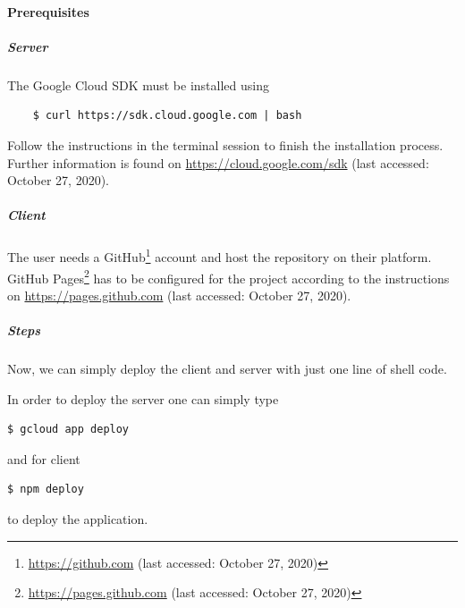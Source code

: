 \paragraph{Prerequisites}   

\subparagraph{Server}
The Google Cloud SDK must be installed using 
\begin{verbatim}
    $ curl https://sdk.cloud.google.com | bash
\end{verbatim}
Follow the instructions in the terminal session to finish the installation process. Further information is found on \url{https://cloud.google.com/sdk} (last accessed: October 27, 2020).

\subparagraph{Client}
The user needs a GitHub\footnote{\url{https://github.com} (last accessed: October 27, 2020)} account and host the repository on their platform. GitHub Pages\footnote{\url{https://pages.github.com} (last accessed: October 27, 2020)} has to be configured for the project according to the instructions on \url{https://pages.github.com} (last accessed: October 27, 2020).

\subparagraph{Steps}
Now, we can simply deploy the client and server with just one line of shell code.

In order to deploy the server one can simply type
\begin{verbatim}
$ gcloud app deploy
\end{verbatim}
and for client
\begin{verbatim}
$ npm deploy
\end{verbatim}
to deploy the application.